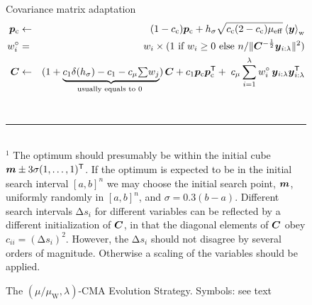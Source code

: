 \documentclass{article} %
\newcommand{\ve}[1]{\mathchoice{\mbox{\boldmath$\displaystyle#1$}}
  {\mbox{\boldmath$\textstyle#1$}} {\mbox{\boldmath$\scriptstyle#1$}}
  {\mbox{\boldmath$\scriptscriptstyle#1$}}}
\newcommand{\ma}[1]{\mathchoice{\mbox{\boldmath$\displaystyle#1$}}
  {\mbox{\boldmath$\textstyle#1$}} {\mbox{\boldmath$\scriptstyle#1$}}
  {\mbox{\boldmath$\scriptscriptstyle#1$}}}
\newcommand{\T}{\ensuremath{\mathsf{T}}}
\newcommand{\N}{\ensuremath{n}}
\newcommand{\rklam}[1]{\left({#1}\right)}
\newcommand{\mueff}{\ensuremath{\mu_\mathrm{eff}}}
\newcommand{\sumw}[1][j]{\ensuremath{{\textstyle\sum{\!w_{#1}}}}}
\newcommand{\summ}[2]{\sum_{#1=1}^{#2}}
\newcommand{\lam}{\ensuremath{\lambda}}
\newcommand{\sig}{\ensuremath{\sigma}}
\newcommand{\cc}{\ensuremath{c_\mathrm{c}}}
\newcommand{\pc}{\ve{p}_\mathrm{c}}
\newcommand{\y}{\ve{y}}
\newcommand{\ilam}{{i:\lam}}
\newcommand{\cone}{\ensuremath{c_1}}
\newcommand{\cmu}{\ensuremath{c_\mu}}
\newcommand{\xmean}{\ensuremath{\ve{m}}}
\newcommand{\rmDelta}{\mathrm{\Delta}}
\newcommand{\nref}[1]{\nolinebreak[4]\hspace{0.2845em plus0.05em minus0.17em}\nolinebreak[4]\ref{#1}}
\begin{document}
\begin{appendix}
\begin{figure}
{{{{Covariance matrix adaptation
\begin{eqnarray}
  \pc &\gets& (1-\cc)\pc + \Hsig\sqrt{\cc(2-\cc)\mueff} 
     \ymean\label{algpc}\\
%
\w_i &=& \label{eq-def-w-dyn}
\text{$w_i\times(1$ if $w_i\ge0$ else $\displaystyle{\N}/{\|\C^{-\frac{1}{2}}\y_\ilam\|^2})$}
\\
%
  \C &\gets& (1+\underbrace{\cone\delta(\Hsig)-\cone-\cmu
              \sumw}_{\text{usually equals to $0$ }}
              )\,\C + \cone
    \pc\pc^\T 
    + \;\cmu
       \summ{i}{\lam}\w_i \,\y_\ilam \y_\ilam^\T\label{algcov}
%
\end{eqnarray}
\\[-4ex]
%
\rule{5em}{0.1ex}\\
{\hspace*{1.5em}$^1$\footnotesize
%
  The optimum should presumably be within the initial cube $ \xmean\pm
  3\sig(1,\dots,1)^\T$. If the optimum is expected to be in the
  initial search interval $[a,b]^\N$ we may choose the initial search
  point, $\xmean$, uniformly randomly in $[a,b]^\N$, and
  $\sig=0.3(b-a)$.  Different search intervals $\mathrm{\Delta} s_i$
  for different variables can be reflected by a different
  initialization of $\ma{C}$, in that the diagonal elements of
  $\ma{C}$ obey $c_{ii}=(\rmDelta s_i)^2$. However, the $\rmDelta
  s_i$ should not disagree by several orders of magnitude. Otherwise a
  scaling of the variables should be applied. }
%

}}}}

  \caption[CMA]{\label{fig:algorithm}The $(\mu/\mu_\mathrm{W},\lambda)$-CMA 
    Evolution Strategy. Symbols: see text}


\end{figure}
\end{appendix}
\end{document}
